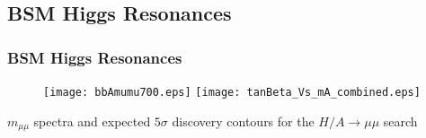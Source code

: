 \subsection*{BSM Higgs Resonances}

\begin{frame}[noframenumbering]
    \frametitle{BSM Higgs Resonances}
\centering
\begin{figure}
    \texttt{[image: bbAmumu700.eps]}
    \texttt{[image: tanBeta\_Vs\_mA\_combined.eps]}
\end{figure}

\vspace{15pt}
\noindent $m_{\mu\mu}$ spectra and expected $5\sigma$ discovery contours
for the $H/A \to \mu\mu$ search
\end{frame}
